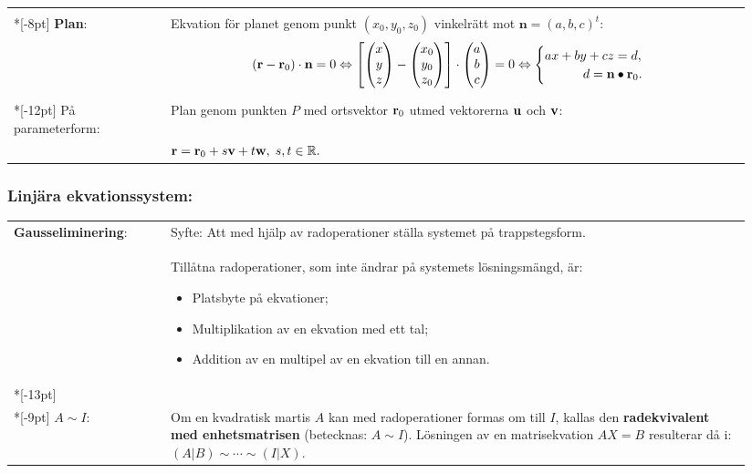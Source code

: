 \documentclass{article}
\begin{document}
\begin{tabular}{|p{0.2\linewidth}|p{0.745\linewidth}|}
  \hline & \\*[-8pt]
  \textbf{Plan}:
  &
  Ekvation för planet genom punkt $(x_0,y_0,z_0)$  vinkelrätt mot
  $\mathbf n=(a,b,c)^t$:
  \[
  (\mathbf{r} - \mathbf{r}_0)\cdot\mathbf{n} = 0
  \iff
  \left[
     \trevektor[x,y,z]
    -\trevektor[x_0,y_0,z_0]
  \right]
  \cdot
  \trevektor[a,b,c]=0
  \iff
  \begin{cases}
  ax+by+cz=d,\cr
  \hspace{3em}  d=\bdn\bullet\bdr_0.
  \end{cases}
  \]
  \\*[-12pt] %
  På parameterform:
  &Plan genom punkten $P$ med ortsvektor ${\mathbf r}_0$ utmed vektorerna ${\mathbf u}$ 
  och ${\mathbf v}$:
  \\
  &
  \hfil
  $
  {\mathbf r} = {\mathbf r}_0 + s{\mathbf v} + t{\mathbf w}, \;s,t\in{\mathbb R}.
  $
  \\
  \hline
\end{tabular}%

\subsubsection*{Linjära ekvationssystem:}%
\begin{tabular}{|p{0.2\linewidth}|p{0.745\linewidth}|}
  \hline
  \textbf{Gausseliminering}:
  &
  Syfte: Att med hjälp av radoperationer ställa systemet på
  trappstegsform.
  \\
  &
  Tillåtna radoperationer, som inte ändrar på systemets lösningsmängd, är:
  \vspace{-7pt}
  \begin{itemize}
      \addtolength{\itemsep}{-7pt}
  \item Platsbyte på ekvationer;
  \item Multiplikation av en ekvation med ett tal;
  \item Addition av en multipel av en ekvation till en annan.
  \end{itemize}
  \\*[-13pt]\hline & \\*[-9pt]
  $A\sim I$:
  &
  Om en kvadratisk martis $A$ kan med radoperationer formas om
  till $I$, kallas den \textbf{radekvivalent med enhetsmatrisen} (betecknas: $A\sim I$).
  Lösningen av en matrisekvation $AX=B$ resulterar då i: 
  $
  (A|B)\sim\cdots\sim (I|X).
  $
  \\\hline
\end{tabular}%
\end{document}
